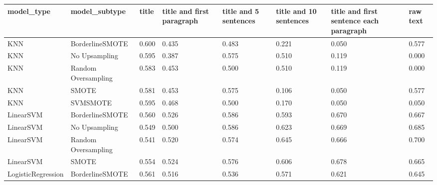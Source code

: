 \begin{tabular}{llllllll}
\toprule
                  model\_type &       model\_subtype & title & title and first paragraph & title and 5 sentences & title and 10 sentences & title and first sentence each paragraph &  raw text \\
\midrule
                         KNN &     BorderlineSMOTE & 0.600 &                     0.435 &                 0.483 &                  0.221 &                                   0.050 &     0.577 \\
                         KNN &       No Upsampling & 0.595 &                     0.387 &                 0.575 &                  0.510 &                                   0.119 &     0.000 \\
                         KNN & Random Oversampling & 0.583 &                     0.453 &                 0.500 &                  0.510 &                                   0.119 &     0.000 \\
                         KNN &               SMOTE & 0.581 &                     0.453 &                 0.575 &                  0.106 &                                   0.050 &     0.577 \\
                         KNN &            SVMSMOTE & 0.595 &                     0.468 &                 0.500 &                  0.170 &                                   0.050 &     0.050 \\
                   LinearSVM &     BorderlineSMOTE & 0.560 &                     0.526 &                 0.586 &                  0.593 &                                   0.670 &     0.667 \\
                   LinearSVM &       No Upsampling & 0.549 &                     0.500 &                 0.586 &                  0.623 &                                   0.669 &     0.685 \\
                   LinearSVM & Random Oversampling & 0.541 &                     0.520 &                 0.574 &                  0.645 &                                   0.666 &     0.700 \\
                   LinearSVM &               SMOTE & 0.554 &                     0.524 &                 0.576 &                  0.606 &                                   0.678 &     0.665 \\
          LogisticRegression &     BorderlineSMOTE & 0.561 &                     0.516 &                 0.536 &                  0.571 &                                   0.621 &     0.645 \\

\end{tabular}

